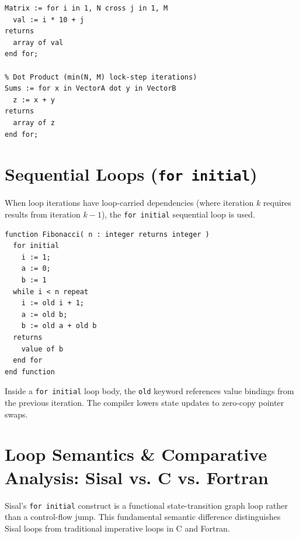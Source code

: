 \begin{lstlisting}[caption={Cross Product vs. Dot Product Generators}]
% Cross Product (N x M iterations)
Matrix := for i in 1, N cross j in 1, M
  val := i * 10 + j
returns
  array of val
end for;

% Dot Product (min(N, M) lock-step iterations)
Sums := for x in VectorA dot y in VectorB
  z := x + y
returns
  array of z
end for;
\end{lstlisting}

\section{Sequential Loops (\texttt{for initial})}
When loop iterations have loop-carried dependencies (where iteration $k$ requires results from iteration $k-1$), the \texttt{for initial} sequential loop is used.

\begin{lstlisting}[caption={Sequential Loop with Zero-Copy Tuple Swapping}]
function Fibonacci( n : integer returns integer )
  for initial
    i := 1;
    a := 0;
    b := 1
  while i < n repeat
    i := old i + 1;
    a := old b;
    b := old a + old b
  returns
    value of b
  end for
end function
\end{lstlisting}

\begin{note}
Inside a \texttt{for initial} loop body, the \texttt{old} keyword references value bindings from the previous iteration. The compiler lowers state updates to zero-copy pointer swaps.
\end{note}

\section{Loop Semantics \& Comparative Analysis: Sisal vs. C vs. Fortran}
Sisal's \texttt{for initial} construct is a functional state-transition graph loop rather than a control-flow jump. This fundamental semantic difference distinguishes Sisal loops from traditional imperative loops in C and Fortran.

